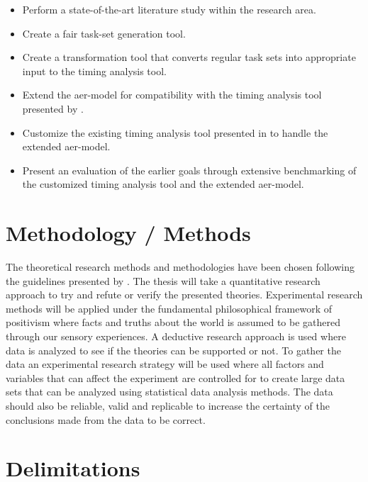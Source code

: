 \documentclass{kththesis}
\begin{document}
\begin{itemize}
    \item Perform a state-of-the-art literature study within the research area.
    \item Create a fair task-set generation tool.
    \item Create a transformation tool that converts regular task sets into appropriate input to the
        timing analysis tool.
    \item Extend the \acrshort{aer}-model for compatibility with the timing analysis tool
        presented by \textcite{nasri_exact_2017}.
    \item Customize the existing timing analysis tool presented in \textcite{nasri_exact_2017} to
        handle the extended \acrshort{aer}-model.
    \item Present an evaluation of the earlier goals through extensive benchmarking of the
        customized timing analysis tool and the extended \acrshort{aer}-model.
\end{itemize}


\section{Methodology / Methods}

The theoretical research methods and methodologies have been chosen following the guidelines
presented by \textcite{hakansson_portal_2013}. The thesis will take a quantitative research approach
to try and refute or verify the presented theories. Experimental research methods will be applied
under the fundamental philosophical framework of positivism where facts and truths about the world
is assumed to be gathered through our sensory experiences. A deductive research approach is used
where data is analyzed to see if the theories can be supported or not. To gather the data an
experimental research strategy will be used where all factors and variables that can affect the
experiment are controlled for to create large data sets that can be analyzed using statistical data
analysis methods. The data should also be reliable, valid and replicable to increase the certainty
of the conclusions made from the data to be correct.


\section{Delimitations}
\end{document}
